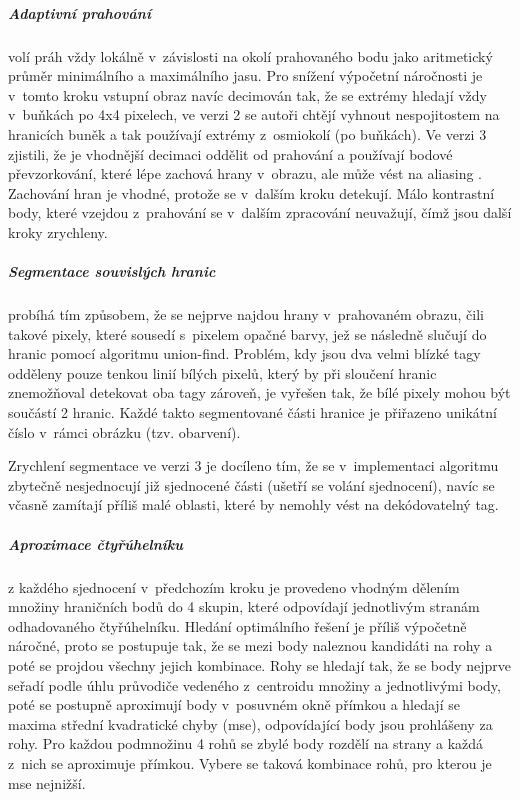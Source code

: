   \subparagraph{Adaptivní prahování} volí práh vždy lokálně v~závislosti na okolí prahovaného bodu jako aritmetický průměr minimálního a maximálního jasu. Pro snížení výpočetní náročnosti je v~tomto kroku vstupní obraz navíc decimován tak, že se extrémy hledají vždy v~buňkách po 4x4 pixelech, ve verzi 2 \cite{apriltag2} se autoři chtějí vyhnout nespojitostem na hranicích buněk a tak používají extrémy z~osmiokolí (po buňkách). Ve verzi 3 zjistili, že je vhodnější decimaci oddělit od prahování a používají bodové převzorkování, které lépe zachová hrany v~obrazu, ale může vést na aliasing \cite{apriltag3}. Zachování hran je vhodné, protože se v~dalším kroku detekují. Málo kontrastní body, které vzejdou z~prahování se v~dalším zpracování neuvažují, čímž jsou další kroky zrychleny.

  \subparagraph{Segmentace souvislých hranic} probíhá tím způsobem, že se nejprve najdou hrany v~prahovaném obrazu, čili takové pixely, které sousedí s~pixelem opačné barvy, jež se následně slučují do hranic pomocí algoritmu union-find. Problém, kdy jsou dva velmi blízké tagy odděleny pouze tenkou linií bílých pixelů, který by při sloučení hranic znemožňoval detekovat oba tagy zároveň, je vyřešen tak, že bílé pixely mohou být součástí 2 hranic. Každé takto segmentované části hranice je přiřazeno unikátní číslo v~rámci obrázku (tzv. obarvení). \cite{apriltag2}
  
  Zrychlení segmentace ve verzi 3 je docíleno tím, že se v~implementaci algoritmu zbytečně nesjednocují již sjednocené části (ušetří se volání sjednocení), navíc se včasně zamítají příliš malé oblasti, které by nemohly vést na dekódovatelný tag. \cite{apriltag3}

  \subparagraph{Aproximace čtyřúhelníku} z každého sjednocení v~předchozím kroku je provedeno vhodným dělením množiny hraničních bodů do 4 skupin, které odpovídají jednotlivým stranám odhadovaného čtyřúhelníku. Hledání optimálního řešení je příliš výpočetně náročné, proto se postupuje tak, že se mezi body naleznou kandidáti na rohy a poté se projdou všechny jejich kombinace. Rohy se hledají tak, že se body nejprve seřadí podle úhlu průvodiče vedeného z~centroidu množiny a jednotlivými body, poté se postupně aproximují body v~posuvném okně přímkou a hledají se maxima střední kvadratické chyby (\acrshort{mse}), odpovídající body jsou prohlášeny za rohy. Pro každou podmnožinu 4 rohů se zbylé body rozdělí na strany a každá z~nich se aproximuje přímkou. Vybere se taková kombinace rohů, pro kterou je \acrshort{mse} nejnižší. \cite{apriltag2}
  
